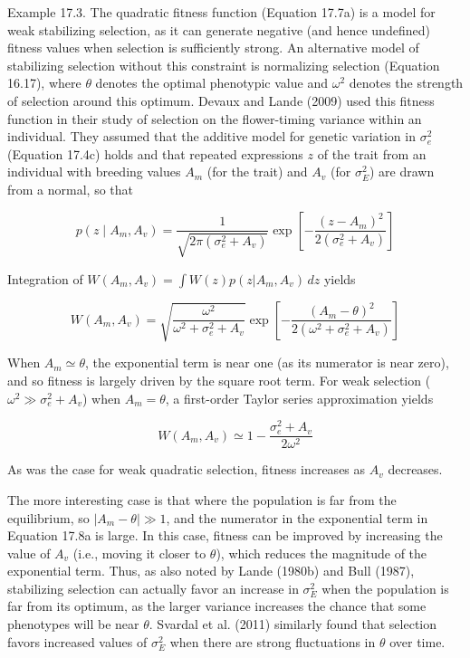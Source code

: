 \documentclass{article}
\begin{document}
Example 17.3. The quadratic fitness function (Equation 17.7a) is a model for weak stabilizing selection, as it can generate negative (and hence undefined) fitness values when selection is sufficiently strong. An alternative model of stabilizing selection without this constraint is normalizing selection (Equation 16.17), where  $ \theta $ denotes the optimal phenotypic value and  $ \omega^2 $ denotes the strength of selection around this optimum. Devaux and Lande (2009) used this fitness function in their study of selection on the flower-timing variance within an individual. They assumed that the additive model for genetic variation in  $ \sigma_e^2 $ (Equation 17.4c) holds and that repeated expressions  $ z $ of the trait from an individual with breeding values  $ A_m $ (for the trait) and  $ A_v $ (for  $ \sigma_E^2 $) are drawn from a normal, so that

\begin{equation}
p(z\mid A_{m},A_{v})=\frac{1}{\sqrt{2\pi(\sigma_{e}^{2}+A_{v})}}\exp\left[-\frac{(z-A_{m})^{2}}{2(\sigma_{e}^{2}+A_{v})}\right]
\end{equation}

Integration of  $  W(A_m, A_v) = \int W(z) p(z | A_m, A_v) \, dz  $ yields

\begin{equation}
W(A_{m},A_{v})=\sqrt{\frac{\omega^{2}}{\omega^{2}+\sigma_{e}^{2}+A_{v}}}\exp\left[-\frac{(A_{m}-\theta)^{2}}{2(\omega^{2}+\sigma_{e}^{2}+A_{v})}\right]
\tag{17.8a}
\label{eq:17_8a}
\end{equation}

When  $ A_m \simeq \theta $, the exponential term is near one (as its numerator is near zero), and so fitness is largely driven by the square root term. For weak selection ( $ \omega^2 \gg \sigma_e^2 + A_v $) when  $ A_m = \theta $, a first-order Taylor series approximation yields

\begin{equation}
W(A_{m},A_{v})\simeq1-\frac{\sigma_{e}^{2}+A_{v}}{2\omega^{2}}
\tag{17.8b}
\label{eq:17_8b}
\end{equation}

As was the case for weak quadratic selection, fitness increases as  $ A_{v} $ decreases.

The more interesting case is that where the population is far from the equilibrium, so  $ |A_m - \theta| \gg 1 $, and the numerator in the exponential term in Equation 17.8a is large. In this case, fitness can be improved by increasing the value of  $ A_v $ (i.e., moving it closer to  $ \theta $), which reduces the magnitude of the exponential term. Thus, as also noted by Lande (1980b) and Bull (1987), stabilizing selection can actually favor an increase in  $ \sigma_E^2 $ when the population is far from its optimum, as the larger variance increases the chance that some phenotypes will be near  $ \theta $. Svardal et al. (2011) similarly found that selection favors increased values of  $ \sigma_E^2 $ when there are strong fluctuations in  $ \theta $ over time.
\end{document}
